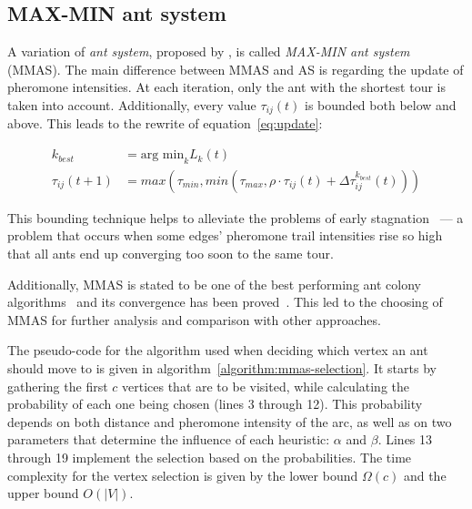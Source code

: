\subsection{MAX-MIN ant system}
\label{section:mmas}

A variation of \textit{ant system}, proposed by \citet{Stutzle1997}, is called
\textit{MAX-MIN ant system} (MMAS). The main difference between MMAS and AS is
regarding the update of pheromone intensities. At each iteration, only the ant
with the shortest tour is taken into account. Additionally, every value
$\tau_{ij}(t)$ is bounded both below and above. This leads to the rewrite of
equation~\ref{eq:update}:

\begin{align}
  k_{best} & = \mbox{arg min}_k L_k(t) \\
  \tau_{ij}(t+1) & = max(\tau_{min}, min(\tau_{max}, \rho \cdot \tau_{ij}(t) + \Delta\tau^{k_{best}}_{ij}(t)))
  \label{eq:update-mmas}
\end{align}

This bounding technique helps to alleviate the problems of early
stagnation~\cite{Stutzle1997} --- a problem that occurs when some edges'
pheromone trail intensities rise so high that all ants end up converging too
soon to the same tour.

Additionally, MMAS is stated to be one of the best performing ant colony
algorithms~\citep{Stutzle2000} and its convergence has been
proved~\citep{Stutzle2002}. This led to the choosing of MMAS for further
analysis and comparison with other approaches.

The pseudo-code for the algorithm used when deciding which vertex an ant should
move to is given in algorithm~\ref{algorithm:mmas-selection}. It starts by
gathering the first $c$ vertices that are to be visited, while calculating the
probability of each one being chosen (lines 3 through 12). This probability
depends on both distance and pheromone intensity of the arc, as well as on two
parameters that determine the influence of each heuristic: $\alpha$ and
$\beta$. Lines 13 through 19 implement the selection based on the
probabilities. The time complexity for the vertex selection is given by the
lower bound $\Omega(c)$ and the upper bound $O(|V|)$.

